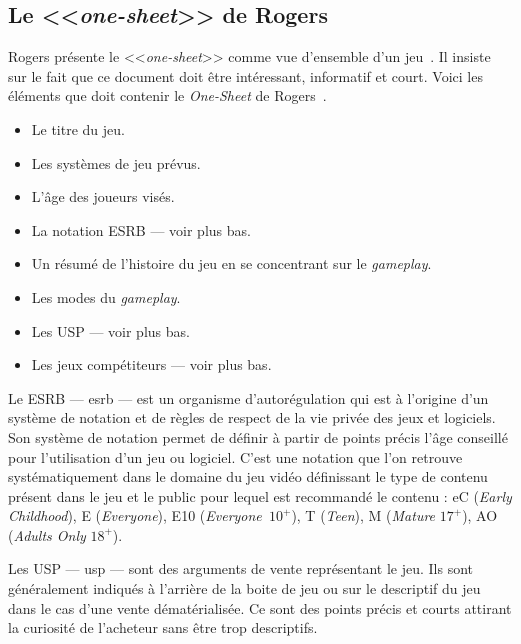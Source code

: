 \subsection{Le <<\emph{one-sheet}>> de Rogers}



Rogers présente le <<\emph{one-sheet}>> comme vue d'ensemble d'un jeu~\cite{LevelUpRogers2014}.
Il insiste sur le fait que ce document doit être intéressant, informatif et court.
Voici les éléments que doit contenir le \emph{One-Sheet} de Rogers~\cite{LevelUpRogers2014}.
\begin{itemize}
    \item Le titre du jeu.
    \item Les systèmes de jeu prévus.
    \item L'\^age des joueurs visés.
    \item La notation ESRB --- voir plus bas.
    \item Un résumé de l'histoire du jeu en se concentrant sur le \emph{gameplay}.
    \item Les modes du \emph{gameplay}.
    \item Les USP --- voir plus bas.
    \item Les jeux compétiteurs --- voir plus bas.
\end{itemize}


Le ESRB --- \gls{esrb} --- est un organisme d'autorégulation qui est à l'origine d'un système de notation et de règles de respect de la vie privée des jeux et logiciels.
Son système de notation permet de définir à partir de points précis l'âge conseillé pour l'utilisation d'un jeu ou logiciel.
C'est une notation que l'on retrouve systématiquement dans le domaine du jeu vidéo définissant le type de contenu présent dans le jeu et le public pour lequel est recommandé le contenu : eC (\emph{Early Childhood}), E (\emph{Everyone}), E10 (\emph{Everyone~$10^+$}), T (\emph{Teen}), M (\emph{Mature} $17^+$), AO (\emph{Adults Only} $18^+$).



Les USP --- \gls{usp} --- sont des arguments de vente représentant le jeu.
Ils sont g\'en\'eralement indiqu\'es à l'arrière de la boite de jeu ou sur le descriptif du jeu dans le cas d'une vente dématérialisée.
Ce sont des points précis et courts attirant la curiosité de l'acheteur sans être trop descriptifs. 


